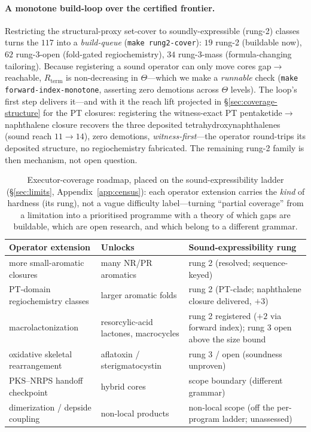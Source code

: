 \documentclass[11pt]{article}
\theoremstyle{definition}
\begin{document}
\paragraph{A monotone build-loop over the certified frontier.} Restricting the structural-proxy set-cover to
soundly-expressible (rung-2) classes turns the $117$ into a \emph{build-queue} (\texttt{make rung2-cover}):
$19$ rung-2 (buildable now), $62$ rung-3-open (fold-gated regiochemistry), $34$ rung-3-mass (formula-changing
tailoring). Because registering a sound operator can only move cores gap$\to$reachable, $R_{\mathrm{term}}$ is
non-decreasing in $\Theta$---which we make a \emph{runnable} check (\texttt{make forward-index-monotone},
asserting zero demotions across $\Theta$ levels). The loop's first step delivers it---and with it the reach lift projected in \S\ref{sec:coverage-structure}
for the PT closures: registering the
witness-exact PT pentaketide$\to$naphthalene closure recovers the three deposited tetrahydroxynaphthalenes
(sound reach $11\to14$), zero demotions, \emph{witness-first}---the
operator round-trips its deposited structure, no regiochemistry fabricated. The remaining rung-2 family is
then mechanism, not open question.

\begin{table}[h]
\centering\small
\caption{Executor-coverage roadmap, placed on the sound-expressibility ladder
(\S\ref{sec:limits}, Appendix~\ref{app:census}): each operator extension carries the \emph{kind} of
hardness (its rung), not a vague difficulty label---turning ``partial coverage'' from a limitation into a
prioritised programme with a theory of which gaps are buildable, which are open research, and which
belong to a different grammar.}
\label{tab:roadmap}
\begin{tabular}{@{}>{\raggedright\arraybackslash}p{}>{\raggedright\arraybackslash}p{}>{\raggedright\arraybackslash}p{}@{}}
\toprule
Operator extension & Unlocks & Sound-expressibility rung \\
\midrule
more small-aromatic closures & many NR/PR aromatics & rung 2 (resolved; sequence-keyed) \\
PT-domain regiochemistry classes & larger aromatic folds & rung 2 (PT-clade; naphthalene closure delivered, $+3$) \\
macrolactonization & resorcylic-acid lactones, macrocycles & rung 2 registered ($+2$ via forward index); rung 3 open above the size bound \\
oxidative skeletal rearrangement & aflatoxin / sterigmatocystin & rung 3 / open (soundness unproven) \\
PKS--NRPS handoff checkpoint & hybrid cores & scope boundary (different grammar) \\
dimerization / depside coupling & non-local products & non-local scope (off the per-program ladder; unassessed) \\
\bottomrule
\end{tabular}
\end{table}
\end{document}
